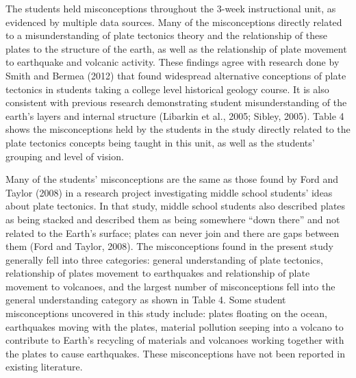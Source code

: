 \documentclass[11.5pt]{sig-alternate} %
\begin{document}
\begin{large}
The students held misconceptions throughout the 3-week instructional unit, as evidenced by multiple data sources.  Many of the misconceptions directly related to a misunderstanding of plate tectonics theory and the relationship of these plates to the structure of the earth, as well as the relationship of plate movement to earthquake and volcanic activity.  These findings agree with research done by Smith and Bermea (2012) that found widespread alternative conceptions of plate tectonics in students taking a college level historical geology course.  It is also consistent with previous research demonstrating student misunderstanding of the earth’s layers and internal structure (Libarkin et al., 2005; Sibley, 2005).  Table 4 shows the misconceptions held by the students in the study directly related to the plate tectonics concepts being taught in this unit, as well as the students’ grouping and level of vision.

Many of the students’ misconceptions are the same as those found by Ford and Taylor (2008) in a research project investigating middle school students’ ideas about plate tectonics. In that study, middle school students also described plates as being stacked and described them as being somewhere “down there” and not related to the Earth’s surface; plates can never join and there are gaps between them (Ford and Taylor, 2008).   The misconceptions found in the present study generally fell into three categories:  general understanding of plate tectonics, relationship of plates movement to earthquakes and relationship of plate movement to volcanoes, and the largest number of misconceptions fell into the general understanding category as shown in Table 4. Some student misconceptions uncovered in this study include: plates floating on the ocean, earthquakes moving with the plates, material pollution seeping into a volcano to contribute to Earth’s recycling of materials and volcanoes working together with the plates to cause earthquakes.  These misconceptions have not been reported in existing literature.  


\end{large}
\end{document}
